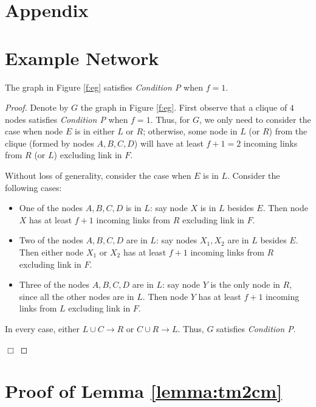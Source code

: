 \documentclass{llncs}
\newcommand{\fillbox}{\hspace*{\fill}\(\Box\)}
\begin{document}
\appendix

\section*{Appendix}

\section{Example Network}
\label{a:example}


\begin{lemma}
The graph in Figure \ref{f:eg} satisfies {\em Condition P} when $f = 1$.
\end{lemma}

\begin{proof}
Denote by $G$ the graph in Figure \ref{f:eg}. First observe that a clique of $4$ nodes satisfies {\em Condition P} when $f=1$. Thus, for $G$, we only need to consider the case when node $E$ is in either $L$ or $R$; otherwise, some node in $L$ (or $R$) from the clique (formed by nodes $A, B, C, D$) will have at least $f+1 = 2$ incoming links from $R$ (or $L$) excluding link in $F$. 

Without loss of generality, consider the case when $E$ is in $L$. Consider the following cases:

\begin{itemize}
\item One of the nodes $A, B, C, D$ is in $L$: say node $X$ is in $L$ besides $E$. Then node $X$ has at least $f+1$ incoming links from $R$ excluding link in $F$.

\item Two of the nodes $A, B, C, D$ are in $L$: say nodes $X_1, X_2$ are in $L$ besides $E$. Then either node $X_1$ or $X_2$ has at least $f+1$ incoming links from $R$ excluding link in $F$.

\item Three of the nodes $A, B, C, D$ are in $L$: say node $Y$ is the only node in $R$, since all the other nodes are in $L$. Then node $Y$ has at least $f+1$ incoming links from $L$ excluding link in $F$.

\end{itemize}
In every case, either $L \cup C \rightarrow R$ or $C \cup R \rightarrow L$. Thus, $G$ satisfies {\em Condition P}.

\fillbox
\end{proof}


\section{Proof of Lemma \ref{lemma:tm2cm}}
\label{a:tm2cm}
\end{document}
